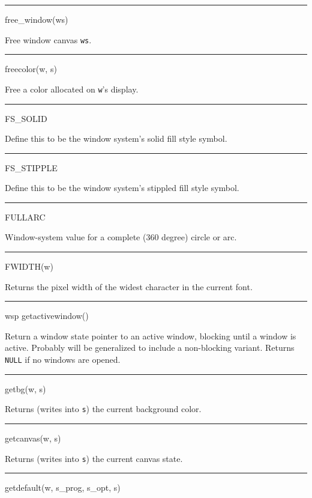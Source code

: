 {\sffamily\bfseries
\bigskip\hrule\vspace{0.1cm}
\noindent
free\_window(ws)}


Free window canvas \texttt{ws}.


{\sffamily\bfseries
\bigskip\hrule\vspace{0.1cm}
\noindent
freecolor(w, s)}


Free a color allocated on \texttt{w}{}'s display.


{\sffamily\bfseries
\bigskip\hrule\vspace{0.1cm}
\noindent
FS\_SOLID}


Define this to be the window system's solid fill style symbol.


{\sffamily\bfseries
\bigskip\hrule\vspace{0.1cm}
\noindent
FS\_STIPPLE}


Define this to be the window system's stippled fill style symbol.


{\sffamily\bfseries
\bigskip\hrule\vspace{0.1cm}
\noindent
FULLARC}


Window-system value for a complete (360 degree) circle or arc.


{\sffamily\bfseries
\bigskip\hrule\vspace{0.1cm}
\noindent
FWIDTH(w)}


Returns the pixel width of the widest character in the current font.


{\sffamily\bfseries
\bigskip\hrule\vspace{0.1cm}
\noindent
wsp getactivewindow()}


Return a window state pointer to an active window, blocking until a
window is active. Probably will be generalized to include a
non-blocking variant. Returns \texttt{NULL} if no windows are opened.


{\sffamily\bfseries
\bigskip\hrule\vspace{0.1cm}
\noindent
getbg(w, s)}


Returns (writes into \texttt{s}) the current background color.


{\sffamily\bfseries
\bigskip\hrule\vspace{0.1cm}
\noindent
getcanvas(w, s)}


Returns (writes into \texttt{s}) the current canvas state.


{\sffamily\bfseries
\bigskip\hrule\vspace{0.1cm}
\noindent
getdefault(w, s\_prog, s\_opt, s)}


